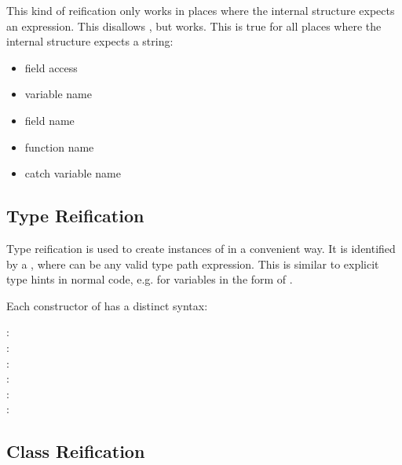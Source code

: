 \documentclass{haxe}
\begin{document}
This kind of reification only works in places where the internal structure expects an expression. This disallows , but  works. This is true for all places where the internal structure expects a string:

\begin{itemize}
	\item field access 
	\item variable name 
\end{itemize}
\begin{itemize}
	\item field name 
	\item function name 
	\item catch variable name 
\end{itemize}


\subsection{Type Reification}
\label{macro-reification-type}

Type reification is used to create instances of  in a convenient way. It is identified by a , where  can be any valid type path expression. This is similar to explicit type hints in normal code, e.g. for variables in the form of .

Each constructor of  has a distinct syntax:

\begin{description}
	\item[:] 
	\item[:] 
	\item[:] 
	\item[:] 
	\item[:] 
	\item[:] 
\end{description}

\subsection{Class Reification}
\label{macro-reification-class}
\end{document}
